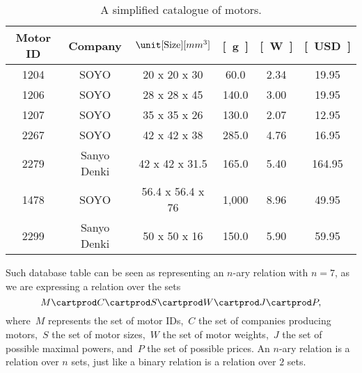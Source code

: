 \begin{table*}[h]
    \centering
    \begin{tabular}{c|c|c|c|c|c}
        Motor ID      & Company              & $\unit[\text{Size}]{[mm^3]}$ & \unit[Weight]{[g]} & \unit[Max Power]{[W]}
                      & \unit[Cost]{[USD]}
        \\
        \hline
        \textsf{1204} & \textsf{SOYO}        & 20 x 20 x 30                 & 60.0               & 2.34                  & 19.95  \\
        \textsf{1206} & \textsf{SOYO}        & 28 x 28 x 45                 & 140.0              & 3.00                  & 19.95  \\
        \textsf{1207} & \textsf{SOYO}        & 35 x 35 x 26                 & 130.0              & 2.07                  & 12.95  \\
        \textsf{2267} & \textsf{SOYO}        & 42 x 42 x 38                 & 285.0              & 4.76                  & 16.95  \\
        \textsf{2279} & \textsf{Sanyo Denki} & 42 x 42 x 31.5               & 165.0              & 5.40                  & 164.95 \\
        \textsf{1478} & \textsf{SOYO}        & 56.4 x 56.4 x 76             & 1,000              & 8.96                  & 49.95  \\
        \textsf{2299} & \textsf{Sanyo Denki} & 50 x 50 x 16                 & 150.0              & 5.90                  & 59.95
    \end{tabular}

    \caption{A simplified catalogue of motors.}
    \label{tab:electric_motors}
\end{table*}


Such database table can be seen as representing an $n$-ary relation with $n = 7$, as we are expressing a relation over the sets
\begin{equation*}
    M\cartprod C\cartprod S\cartprod W\cartprod J\cartprod P,
\end{equation*}
where~$M$ represents the set of motor IDs,~$C$ the set of companies producing motors,~$S$ the set of motor sizes,~$W$ the set of motor weights,~$J$ the set of possible maximal powers, and~$P$ the set of possible prices.
An $n$-ary relation is a relation over $n$ sets, just like a binary relation is a relation over $2$ sets.

